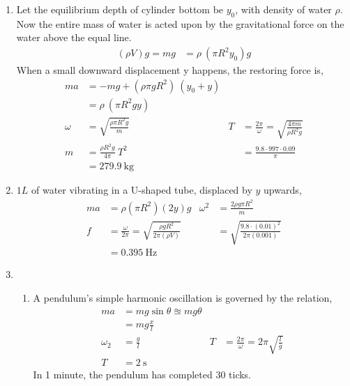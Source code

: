 \begin{enumerate}
    \item Let the equilibrium depth of cylinder bottom be $ y_{0} $, with density of water $ \rho $. Now the entire
          mass of water is acted upon by the gravitational force on the water above the equal line.
          \begin{align}
              (\rho V)g = mg & = \rho\ (\pi R^{2} y_{0})g
          \end{align}
          When a small downward displacement y happens, the restoring force is,
          \begin{align}
              ma     & = -mg + (\rho\pi g R^{2})\ (y_{0} + y)                                                                  \\
                     & = \rho\ (\pi R^{2} g y)                                                                                 \\
              \omega & =\sqrt{\frac{\rho\pi R^{2}g}{m}}       & T & = \frac{2\pi}{\omega} = \sqrt{\frac{4\pi m}{\rho R^{2} g}} \\
              m      & =\frac{\rho R^{2}g}{4\pi}\ T^{2}       &   & = \frac{9.8 \cdot 997 \cdot 0.09}{\pi}                     \\
                     & = \SI{279.9}{\kg}
          \end{align}

    \item $ 1 L $ of water vibrating in a U-shaped tube, displaced by $ y $ upwards,
          \begin{align}
              ma & = \rho (\pi R^{2})(2y)g
                 & \omega^{2}                                                        & = \frac{2\rho g \pi R^{2}}{m}                       \\
              f  & = \frac{\omega}{2\pi} = \sqrt{\frac{\rho g R^{2}}{2\pi (\rho V)}}
                 &                                                                   & = \sqrt{\frac{9.8 \cdot (0.01)^{2}}{2 \pi (0.001)}} \\
                 & = \SI{0.395}{\Hz}
          \end{align}

    \item
          \begin{enumerate}
              \item A pendulum's simple harmonic oscillation is governed by the relation,
                    \begin{align}
                        ma         & = mg \sin \theta \approxeq mg \theta                                                       \\
                                   & = mg \frac{x}{l}                                                                           \\
                        \omega_{2} & = \frac{g}{l}                        & T & = \frac{2\pi}{\omega} = 2\pi \sqrt{\frac{l}{g}} \\
                        T          & = \SI{2}{\s}
                    \end{align}
                    In 1 minute, the pendulum has completed 30 ticks.


\end{enumerate}
\end{enumerate}
